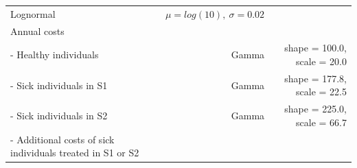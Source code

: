 \documentclass[]{article}
\begin{document}
\begin{longtable}[]{@{}lrr@{}}
\begin{minipage}[t]{0.17\columnwidth}
Lognormal\strut
\end{minipage} & \begin{minipage}[t]{0.42\columnwidth}\raggedleft\strut
\(\mu = log(10), \ \sigma = 0.02\)\strut
\end{minipage}\tabularnewline
\begin{minipage}[t]{0.32\columnwidth}\raggedright\strut
Annual costs\strut
\end{minipage} & \begin{minipage}[t]{0.17\columnwidth}\raggedleft\strut
\strut
\end{minipage} & \begin{minipage}[t]{0.42\columnwidth}\raggedleft\strut
\strut
\end{minipage}\tabularnewline
\begin{minipage}[t]{0.32\columnwidth}\raggedright\strut
- Healthy individuals\strut
\end{minipage} & \begin{minipage}[t]{0.17\columnwidth}\raggedleft\strut
Gamma\strut
\end{minipage} & \begin{minipage}[t]{0.42\columnwidth}\raggedleft\strut
shape = 100.0, scale = 20.0\strut
\end{minipage}\tabularnewline
\begin{minipage}[t]{0.32\columnwidth}\raggedright\strut
- Sick individuals in S1\strut
\end{minipage} & \begin{minipage}[t]{0.17\columnwidth}\raggedleft\strut
Gamma\strut
\end{minipage} & \begin{minipage}[t]{0.42\columnwidth}\raggedleft\strut
shape = 177.8, scale = 22.5\strut
\end{minipage}\tabularnewline
\begin{minipage}[t]{0.32\columnwidth}\raggedright\strut
- Sick individuals in S2\strut
\end{minipage} & \begin{minipage}[t]{0.17\columnwidth}\raggedleft\strut
Gamma\strut
\end{minipage} & \begin{minipage}[t]{0.42\columnwidth}\raggedleft\strut
shape = 225.0, scale = 66.7\strut
\end{minipage}\tabularnewline
\begin{minipage}[t]{0.32\columnwidth}\raggedright\strut
- Additional costs of sick individuals treated in S1 or S2\strut
\end{minipage} & \begin{minipage}[t]{0.17\columnwidth}\raggedleft\strut

\end{minipage}
\end{longtable}
\end{document}
